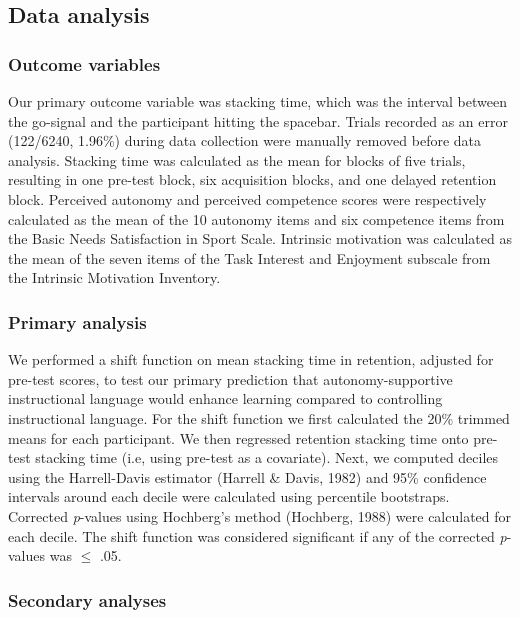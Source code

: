 \documentclass[
  man, donotrepeattitle,mask,floatsintext]{apa7}
\begin{document}
\hypertarget{data-analysis}{%
\subsection{Data analysis}\label{data-analysis}}

\hypertarget{outcome-variables}{%
\subsubsection{Outcome variables}\label{outcome-variables}}

Our primary outcome variable was stacking time, which was the interval between the go-signal and the participant hitting the spacebar. Trials recorded as an error (122/6240, 1.96\%) during data collection were manually removed before data analysis. Stacking time was calculated as the mean for blocks of five trials, resulting in one pre-test block, six acquisition blocks, and one delayed retention block. Perceived autonomy and perceived competence scores were respectively calculated as the mean of the 10 autonomy items and six competence items from the Basic Needs Satisfaction in Sport Scale. Intrinsic motivation was calculated as the mean of the seven items of the Task Interest and Enjoyment subscale from the Intrinsic Motivation Inventory.

\hypertarget{primary-analysis}{%
\subsubsection{Primary analysis}\label{primary-analysis}}

We performed a shift function on mean stacking time in retention, adjusted for pre-test scores, to test our primary prediction that autonomy-supportive instructional language would enhance learning compared to controlling instructional language. For the shift function we first calculated the 20\% trimmed means for each participant. We then regressed retention stacking time onto pre-test stacking time (i.e, using pre-test as a covariate). Next, we computed deciles using the Harrell-Davis estimator (Harrell \& Davis, 1982) and 95\% confidence intervals around each decile were calculated using percentile bootstraps. Corrected \emph{p}-values using Hochberg's method (Hochberg, 1988) were calculated for each decile. The shift function was considered significant if any of the corrected \emph{p}-values was \(\leq\) .05.

\hypertarget{secondary-analyses}{%
\subsubsection{Secondary analyses}\label{secondary-analyses}}
\end{document}

